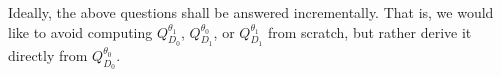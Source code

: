 

Ideally, the above questions shall be answered
incrementally. That is, we would like to avoid
computing $Q_{D_0}^{\theta_1}$,
$Q_{D_1}^{\theta_0}$, or $Q_{D_1}^{\theta_1}$ from
scratch, but rather derive it directly from
$Q_{D_0}^{\theta_0}$.

